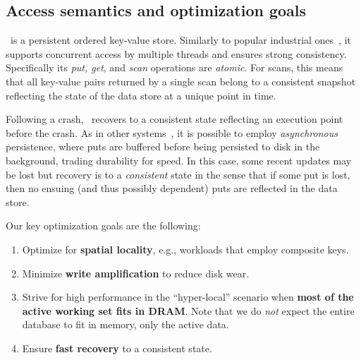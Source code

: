 
\subsection{Access semantics and optimization goals}
\sys\ is a persistent ordered key-value store. Similarly to popular industrial ones~\cite{hbase,leveldb,RocksDB}, 
it supports concurrent access by multiple threads and ensures strong consistency. 
Specifically its \emph{put, get}, and \emph{scan} operations are \emph{atomic}.  
For scans, this means that all key-value pairs returned by a single scan belong to a consistent 
snapshot reflecting the state of the data store at a unique point in time.

Following a crash, \sys\ recovers to a consistent state reflecting an execution point before the crash.
As in other systems~\cite{leveldb,RocksDB},  it is possible to employ
\emph{asynchronous} persistence, where puts are buffered before being persisted to disk in the background,  
 trading durability for speed. In this case, some recent updates may be lost but 
 recovery is to a \emph{consistent} state  
in the sense that if some put is lost, then no ensuing (and thus possibly dependent) puts are reflected in the data store.


\noindent
Our key optimization goals are the following:
\begin{enumerate}
\item Optimize for {\bf spatial locality}, e.g., workloads that employ composite keys.
 
\item Minimize {\bf write amplification}  to %
reduce disk wear.%
 
\item %
Strive for high performance in the ``hyper-local'' scenario when {\bf most of the active working set fits in DRAM}. 
Note that we do \emph{not} expect the entire database to fit in
memory, only the active data.  
 
\item Ensure {\bf fast recovery} to a consistent state.  
\end{enumerate}

